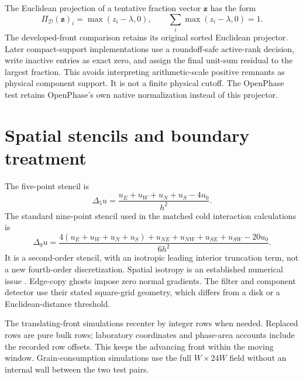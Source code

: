 \documentclass[a4paper,11pt]{article}
\begin{document}
The Euclidean projection of a tentative fraction vector $\mathbf z$ has the form
\begin{equation}
 \Pi_{\mathcal D}(\mathbf z)_i=\max(z_i-\lambda,0),
 \qquad \sum_i\max(z_i-\lambda,0)=1.
\end{equation}
The developed-front comparison retains its original sorted Euclidean projector. Later compact-support implementations use a roundoff-safe active-rank decision, write inactive entries as exact zero, and assign the final unit-sum residual to the largest fraction. This avoids interpreting arithmetic-scale positive remnants as physical component support. It is not a finite physical cutoff. The OpenPhase test retains OpenPhase's own native normalization instead of this projector.

\section{Spatial stencils and boundary treatment}
The five-point stencil is
\begin{equation}
 \Delta_5 u=\frac{u_E+u_W+u_N+u_S-4u_0}{h^2}.
\end{equation}
The standard nine-point stencil used in the matched cold interaction calculations is
\begin{equation}
 \Delta_9u=
 \frac{4(u_E+u_W+u_N+u_S)
       +u_{NE}+u_{NW}+u_{SE}+u_{SW}-20u_0}{6h^2}.
\end{equation}
It is a second-order stencil, with an isotropic leading interior truncation term, not a new fourth-order discretization. Spatial isotropy is an established numerical issue \citep{tang2024}. Edge-copy ghosts impose zero normal gradients. The filter and component detector use their stated square-grid geometry, which differs from a disk or a Euclidean-distance threshold.

The translating-front simulations recenter by integer rows when needed. Replaced rows are pure bulk rows; laboratory coordinates and phase-area accounts include the recorded row offsets. This keeps the advancing front within the moving window. Grain-consumption simulations use the full $W\times24W$ field without an internal wall between the two test pairs.
\end{document}
